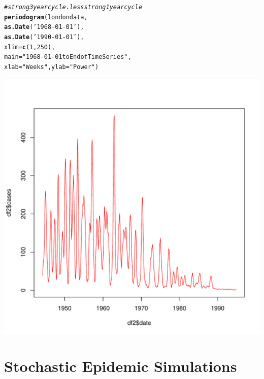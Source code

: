 \documentclass[12pt]{article}\usepackage[]{graphicx}\usepackage[]{color}
\makeatletter
\def\maxwidth{ %
  \ifdim\Gin@nat@width>\linewidth
    \linewidth
  \else
    \Gin@nat@width
  \fi
}
\newcommand{\hlnum}[1]{\textcolor[rgb]{0.686,0.059,0.569}{#1}}%
\newcommand{\hlstr}[1]{\textcolor[rgb]{0.192,0.494,0.8}{#1}}%
\newcommand{\hlcom}[1]{\textcolor[rgb]{0.678,0.584,0.686}{\textit{#1}}}%
\newcommand{\hlstd}[1]{\textcolor[rgb]{0.345,0.345,0.345}{#1}}%
\newcommand{\hlkwc}[1]{\textcolor[rgb]{0.333,0.667,0.333}{#1}}%
\newcommand{\hlkwd}[1]{\textcolor[rgb]{0.737,0.353,0.396}{\textbf{#1}}}%
\newenvironment{kframe}{%
 \def\at@end@of@kframe{}%
 \ifinner\ifhmode%
  \def\at@end@of@kframe{\end{minipage}}%
  \begin{minipage}{\columnwidth}%
 \fi\fi%
 \def\FrameCommand##1{\hskip\@totalleftmargin \hskip-\fboxsep
 \colorbox{shadecolor}{##1}\hskip-\fboxsep
     \hskip-\linewidth \hskip-\@totalleftmargin \hskip\columnwidth}%
 \MakeFramed {\advance\hsize-\width
   \@totalleftmargin\z@ \linewidth\hsize
   \@setminipage}}%
 {\par\unskip\endMakeFramed%
 \at@end@of@kframe}
\newenvironment{knitrout}{}{} %
\makeatother
\begin{document}
\begin{enumerate}[(a)]
\begin{knitrout}
\begin{kframe}
\begin{alltt}
\hlcom{#strong 3 year cycle. less strong 1 year cycle}
\hlkwd{periodogram}\hlstd{(londondata,}
            \hlkwd{as.Date}\hlstd{(}\hlstr{'1968-01-01'}\hlstd{),}
            \hlkwd{as.Date}\hlstd{(}\hlstr{'1990-01-01'}\hlstd{),}
            \hlkwc{xlim}\hlstd{=}\hlkwd{c}\hlstd{(}\hlnum{1}\hlstd{,}\hlnum{250}\hlstd{),}
            \hlkwc{main}\hlstd{=}\hlstr{"1968-01-01 to End of Time Series"}\hlstd{,}
            \hlkwc{xlab}\hlstd{=}\hlstr{"Weeks"}\hlstd{,} \hlkwc{ylab}\hlstd{=}\hlstr{"Power"}\hlstd{)}
\end{alltt}
\end{kframe}
\includegraphics[width=\maxwidth]{figure/unnamed-chunk-5-2} 

\end{knitrout}

\end{enumerate}

\section{Stochastic Epidemic Simulations}

\SEintro
\end{document}
